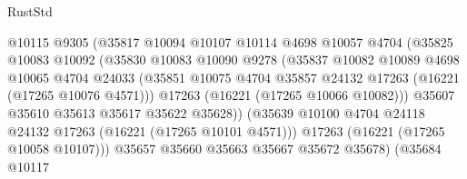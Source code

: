 \begin{lexlean}{RustStd}
\begin{coremodule}
                                  @10115
                                  @9305
                                  (@35817
                                    @10094
                                    @10107
                                    @10114
                                    @4698
                                    @10057
                                    @4704
                                    (@35825
                                      @10083
                                      @10092
                                      (@35830
                                        @10083
                                        @10090
                                        @9278
                                        (@35837
                                          @10082
                                          @10089
                                          @4698
                                          @10065
                                          @4704
                                          @24033
                                          (@35851
                                            @10075
                                            @4704
                                            @35857
                                            @24132
                                            @17263
                                            (@16221 (@17265 @10076 @4571)))
                                          @17263
                                          (@16221 (@17265 @10066 @10082)))
                                        @35607
                                        @35610
                                        @35613
                                        @35617
                                        @35622
                                        @35628))
                                    (@35639
                                      @10100
                                      @4704
                                      @24118
                                      @24132
                                      @17263
                                      (@16221 (@17265 @10101 @4571)))
                                    @17263
                                    (@16221 (@17265 @10058 @10107)))
                                  @35657
                                  @35660
                                  @35663
                                  @35667
                                  @35672
                                  @35678)
                                (@35684
                                  @10117

\end{coremodule}
\end{lexlean}
